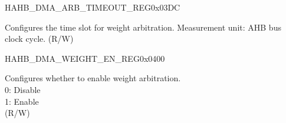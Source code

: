 \begin{register}{H}{AHB\_DMA\_ARB\_TIMEOUT\_REG}{0x03DC}\label{regdesc:AHBDMAARBTIMEOUTREG}
%
%
\regnewline%
\begin{regdesc}\begin{reglist}
\label{fielddesc:AHBDMAARBTIMEOUT}\item [AHB\_DMA\_ARB\_TIMEOUT] Configures the time slot for weight arbitration. Measurement unit: AHB bus clock cycle. (R/W)
\end{reglist}\end{regdesc}
\end{register}


\begin{register}{H}{AHB\_DMA\_WEIGHT\_EN\_REG}{0x0400}\label{regdesc:AHBDMAWEIGHTENREG}
%
%
\regnewline%
\begin{regdesc}\begin{reglist}
\label{fielddesc:AHBDMAWEIGHTEN}\item [AHB\_DMA\_WEIGHT\_EN] Configures whether to enable weight arbitration.\\
0: Disable\\
1: Enable\\ (R/W)
\end{reglist}\end{regdesc}
\end{register}


